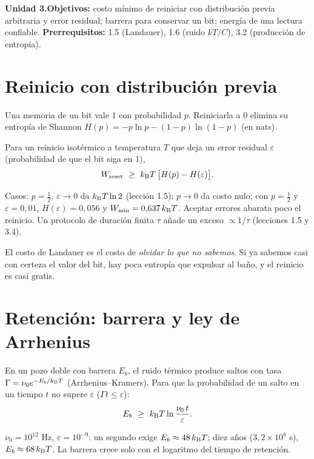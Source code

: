 \documentclass[11pt,a4paper]{article}
\begin{document}

\noindent\textbf{Unidad 3.}\quad\textbf{Objetivos:} costo mínimo de reiniciar con distribución previa arbitraria y error residual;
barrera para conservar un bit; energía de una lectura confiable.
\textbf{Prerrequisitos:} 1.5 (Landauer), 1.6 (ruido $kT/C$), 3.2 (producción de entropía).

\section{Reinicio con distribución previa}
Una memoria de un bit vale 1 con probabilidad $p$. Reiniciarla a 0 elimina su entropía de Shannon $H(p)=-p\ln p-(1-p)\ln(1-p)$ (en nats).
\begin{resultado}
Para un reinicio isotérmico a temperatura $T$ que deja un error residual $\varepsilon$ (probabilidad de que el bit siga en 1),
\begin{equation}
W_{\text{reset}}\ \ge\ k_{\mathrm B} T\,\big[H(p)-H(\varepsilon)\big].
\end{equation}
\end{resultado}
\noindent Casos: $p=\tfrac12$, $\varepsilon\to0$ da $k_{\mathrm B} T\ln2$ (lección 1.5); $p\to0$ da costo nulo; con $p=\tfrac12$ y $\varepsilon=0{,}01$,
$H(\varepsilon)=0{,}056$ y $W_{\min}=0{,}637\,k_{\mathrm B} T$. Aceptar errores abarata poco el reinicio. Un protocolo de duración finita $\tau$ añade un exceso
$\propto1/\tau$ (lecciones 1.5 y 3.4).

\begin{intuicion}
El costo de Landauer es el costo de \emph{olvidar lo que no sabemos}. Si ya sabemos casi con certeza el valor del bit, hay poca entropía que
expulsar al baño, y el reinicio es casi gratis.
\end{intuicion}

\section{Retención: barrera y ley de Arrhenius}
En un pozo doble con barrera $E_b$, el ruido térmico produce saltos con tasa $\Gamma=\nu_0e^{-E_b/k_{\mathrm B} T}$ (Arrhenius--Kramers). Para que la
probabilidad de un salto en un tiempo $t$ no supere $\varepsilon$ ($\Gamma t\le\varepsilon$):
\begin{equation}
E_b\ \ge\ k_{\mathrm B} T\ln\frac{\nu_0\,t}{\varepsilon}.
\end{equation}
\begin{ejemplo}
$\nu_0=10^{12}$ Hz, $\varepsilon=10^{-9}$: un segundo exige $E_b\approx48\,k_{\mathrm B} T$; diez años ($3{,}2\times10^8$ s), $E_b\approx68\,k_{\mathrm B} T$.
La barrera crece solo con el logaritmo del tiempo de retención.
\end{ejemplo}
\end{document}
